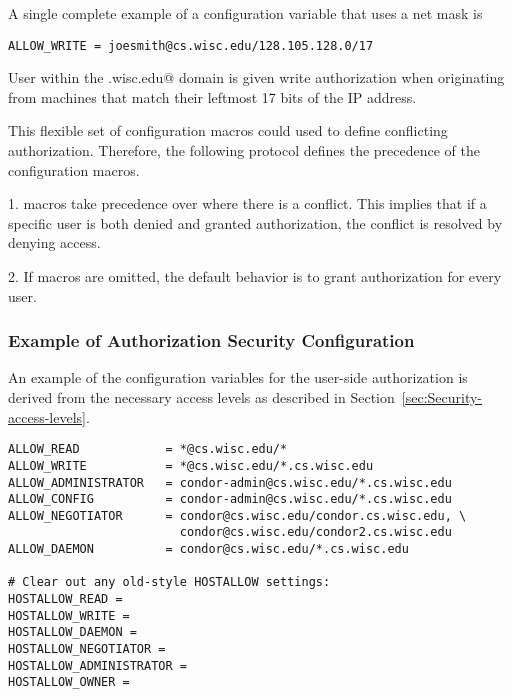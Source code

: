 A single complete example of a configuration variable that uses
a net mask is
\footnotesize
\begin{verbatim}
ALLOW_WRITE = joesmith@cs.wisc.edu/128.105.128.0/17
\end{verbatim}
\normalsize
User \verb@joesmith@ within the
\verb@cs.wisc.edu@ domain is given write authorization
when originating from machines that match their leftmost
17 bits of the IP address.

This flexible set of configuration macros could used to define
conflicting authorization.
Therefore, the following protocol defines the precedence of the
configuration macros.
\begin{description}
\item{1. } macros take precedence over 
where there is a conflict.
This implies that if a specific user is both denied and granted authorization,
the conflict is resolved by denying access.
\item{2. }If macros are omitted, the default behavior is to grant
authorization for every user.
\end{description}
\subsubsection{\label{sec:Security-sample2} Example of Authorization Security Configuration}

An example of the configuration variables for the user-side
authorization is derived from the necessary access levels
as described in
Section~\ref{sec:Security-access-levels}.

\footnotesize
\begin{verbatim}
ALLOW_READ            = *@cs.wisc.edu/*
ALLOW_WRITE           = *@cs.wisc.edu/*.cs.wisc.edu
ALLOW_ADMINISTRATOR   = condor-admin@cs.wisc.edu/*.cs.wisc.edu
ALLOW_CONFIG          = condor-admin@cs.wisc.edu/*.cs.wisc.edu
ALLOW_NEGOTIATOR      = condor@cs.wisc.edu/condor.cs.wisc.edu, \
                        condor@cs.wisc.edu/condor2.cs.wisc.edu
ALLOW_DAEMON          = condor@cs.wisc.edu/*.cs.wisc.edu

# Clear out any old-style HOSTALLOW settings:
HOSTALLOW_READ =
HOSTALLOW_WRITE =
HOSTALLOW_DAEMON =
HOSTALLOW_NEGOTIATOR =
HOSTALLOW_ADMINISTRATOR =
HOSTALLOW_OWNER =
\end{verbatim}
\normalsize


